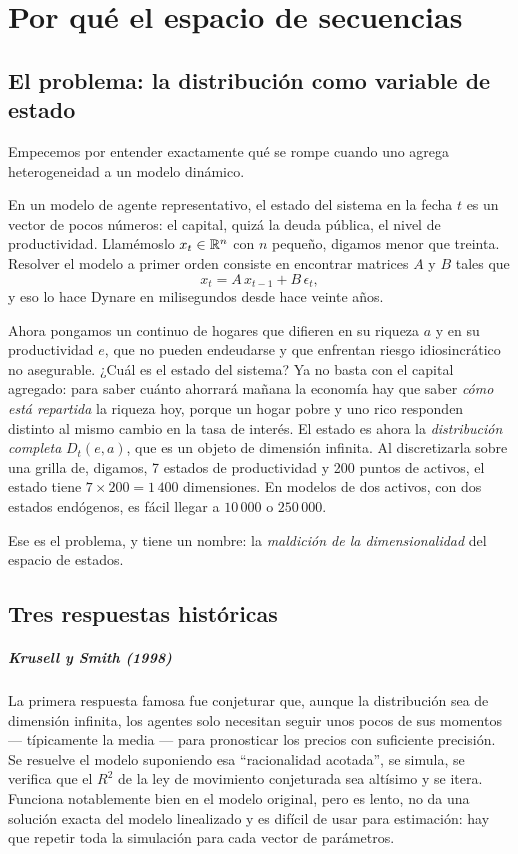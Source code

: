 \chapter{Por qué el espacio de secuencias}
\label{cap:porque}

\section{El problema: la distribución como variable de estado}

Empecemos por entender exactamente qué se rompe cuando uno agrega
heterogeneidad a un modelo dinámico.

En un modelo de agente representativo, el estado del sistema en la fecha $t$ es
un vector de pocos números: el capital, quizá la deuda pública, el nivel de
productividad. Llamémoslo $x_t \in \mathbb{R}^n$ con $n$ pequeño, digamos menor que
treinta. Resolver el modelo a primer orden consiste en encontrar matrices
$A$ y $B$ tales que
\begin{equation}
x_t = A\, x_{t-1} + B\, \epsilon_t ,
\end{equation}
y eso lo hace Dynare en milisegundos desde hace veinte años.

Ahora pongamos un continuo de hogares que difieren en su riqueza $a$ y en su
productividad $e$, que no pueden endeudarse y que enfrentan riesgo idiosincrático
no asegurable. ¿Cuál es el estado del sistema? Ya no basta con el capital
agregado: para saber cuánto ahorrará mañana la economía hay que saber
\emph{cómo está repartida} la riqueza hoy, porque un hogar pobre y uno rico
responden distinto al mismo cambio en la tasa de interés. El estado es ahora la
\emph{distribución completa} $D_t(e,a)$, que es un objeto de dimensión infinita.
Al discretizarla sobre una grilla de, digamos, 7 estados de productividad y 200
puntos de activos, el estado tiene $7 \times 200 = 1\,400$ dimensiones. En
modelos de dos activos, con dos estados endógenos, es fácil llegar a $10\,000$ o
$250\,000$.

Ese es el problema, y tiene un nombre: la \emph{maldición de la
dimensionalidad} del espacio de estados.

\section{Tres respuestas históricas}

\paragraph{Krusell y Smith (1998)} La primera respuesta famosa fue conjeturar
que, aunque la distribución sea de dimensión infinita, los agentes solo necesitan
seguir unos pocos de sus momentos --- típicamente la media --- para pronosticar
los precios con suficiente precisión. Se resuelve el modelo suponiendo esa
``racionalidad acotada'', se simula, se verifica que el $R^2$ de la ley de
movimiento conjeturada sea altísimo y se itera. Funciona notablemente bien en el
modelo original, pero es lento, no da una solución exacta del modelo linealizado
y es difícil de usar para estimación: hay que repetir toda la simulación para
cada vector de parámetros.


